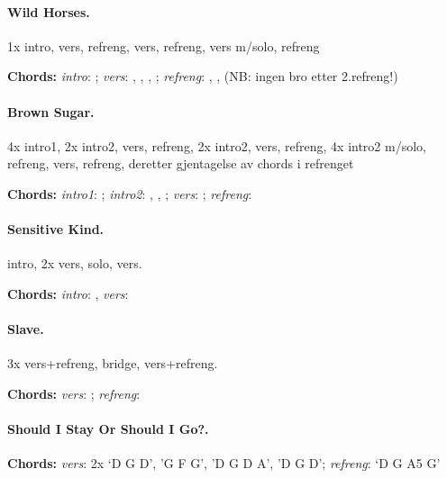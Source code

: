 \documentclass[%
twoside,                 %
draft,                   %
final,                   %
10pt]{article}
\begin{document}
\paragraph{Wild Horses.}
1x intro, vers, refreng, vers, refreng, vers m/solo, refreng

\textbf{Chords:} \emph{intro}: ;
\emph{vers}: , , , ;
\emph{refreng}: , , 
(NB: ingen bro etter 2.refreng!)





\paragraph{Brown Sugar.}
4x intro1, 2x intro2, vers, refreng, 2x intro2, vers, refreng, 4x intro2 m/solo, refreng, vers, refreng, deretter gjentagelse av chords i refrenget

\textbf{Chords:} \emph{intro1}: ; \emph{intro2}: , , ;
\emph{vers}: ; \emph{refreng}: 




\paragraph{Sensitive Kind.}
intro, 2x vers, solo, vers.

\textbf{Chords:} \emph{intro}: , \emph{vers}: 





\paragraph{Slave.}
3x vers+refreng, bridge, vers+refreng.

\textbf{Chords:} \emph{vers}: ; \emph{refreng}: 




\paragraph{Should I Stay Or Should I Go?.}
\textbf{Chords:} \emph{vers}: 2x `D G D', 'G F G', 'D G D A', 'D G D';
\emph{refreng}: `D G A5 G'
\end{document}

